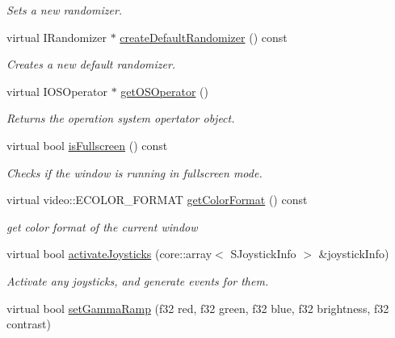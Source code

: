 \begin{DoxyCompactItemize}
\begin{DoxyCompactList}\small\item\em Sets a new randomizer. \end{DoxyCompactList}\item 
\hypertarget{classirr_1_1_c_irr_device_stub_a97a36295702a83696ac0d0e48d82d32d}{virtual I\-Randomizer $\ast$ \hyperlink{classirr_1_1_c_irr_device_stub_a97a36295702a83696ac0d0e48d82d32d}{create\-Default\-Randomizer} () const }\label{classirr_1_1_c_irr_device_stub_a97a36295702a83696ac0d0e48d82d32d}

\begin{DoxyCompactList}\small\item\em Creates a new default randomizer. \end{DoxyCompactList}\item 
\hypertarget{classirr_1_1_c_irr_device_stub_a72f29a787cf13537d8728885f69b93cc}{virtual I\-O\-S\-Operator $\ast$ \hyperlink{classirr_1_1_c_irr_device_stub_a72f29a787cf13537d8728885f69b93cc}{get\-O\-S\-Operator} ()}\label{classirr_1_1_c_irr_device_stub_a72f29a787cf13537d8728885f69b93cc}

\begin{DoxyCompactList}\small\item\em Returns the operation system opertator object. \end{DoxyCompactList}\item 
\hypertarget{classirr_1_1_c_irr_device_stub_a4dc12cd3ee147535da35f89816fcf414}{virtual bool \hyperlink{classirr_1_1_c_irr_device_stub_a4dc12cd3ee147535da35f89816fcf414}{is\-Fullscreen} () const }\label{classirr_1_1_c_irr_device_stub_a4dc12cd3ee147535da35f89816fcf414}

\begin{DoxyCompactList}\small\item\em Checks if the window is running in fullscreen mode. \end{DoxyCompactList}\item 
virtual video\-::\-E\-C\-O\-L\-O\-R\-\_\-\-F\-O\-R\-M\-A\-T \hyperlink{classirr_1_1_c_irr_device_stub_a3a5d21d55d4ab1ff28a470aff4ef6221}{get\-Color\-Format} () const 
\begin{DoxyCompactList}\small\item\em get color format of the current window \end{DoxyCompactList}\item 
virtual bool \hyperlink{classirr_1_1_c_irr_device_stub_a8f77b9fae9bf71552ea03dcfbdaa7743}{activate\-Joysticks} (core\-::array$<$ S\-Joystick\-Info $>$ \&joystick\-Info)
\begin{DoxyCompactList}\small\item\em Activate any joysticks, and generate events for them. \end{DoxyCompactList}\item 
\hypertarget{classirr_1_1_c_irr_device_stub_aebe5b1ca3dd202a9107a3e6d4fe7c351}{virtual bool \hyperlink{classirr_1_1_c_irr_device_stub_aebe5b1ca3dd202a9107a3e6d4fe7c351}{set\-Gamma\-Ramp} (f32 red, f32 green, f32 blue, f32 brightness, f32 contrast)}\label{classirr_1_1_c_irr_device_stub_aebe5b1ca3dd202a9107a3e6d4fe7c351}


\end{DoxyCompactItemize}
